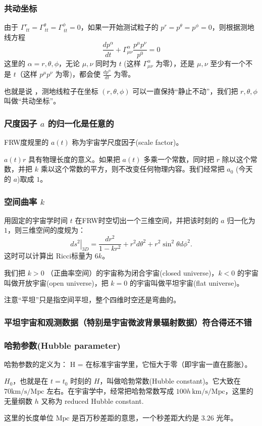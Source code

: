 \documentclass[CJK,13pt]{beamer}
\begin{document}
\begin{frame}
  \frametitle{共动坐标}
  由于 $\Gamma^r_{\ tt}=\Gamma^\theta_{\ tt} =\Gamma^{\phi}_{\ tt}=0$，如果一开始测试粒子的 $p^r=p^\theta=p^\phi = 0$，则根据测地线方程
  $$\frac{d p^\alpha}{dt} + \Gamma^{\alpha}_{\mu\nu}\frac{p^\mu p^\nu}{p^0} = 0$$
  这里的 $\alpha=r, \theta,\phi$，无论 $\mu,\nu$ 同时为 $t$ (这样 $\Gamma^{\alpha}_{\mu\nu}$ 为零），还是 $\mu,\nu$ 至少有一个不是 $t$（这样 $p^\mu p^\nu$ 为零)，都会使 $\frac{d p^\alpha}{dt}$ 为零。

      
  也就是说 ，测地线粒子在坐标 $(r,\theta,\phi)$ 可以一直保持“静止不动”，我们把 $r,\theta,\phi$ 叫做“共动坐标”。  
\end{frame}


\begin{frame}
  \frametitle{尺度因子 $a$ 的归一化是任意的} 
  FRW度规里的 $a(t)$ 称为{\blue 宇宙学尺度因子(scale factor)}。

  \skipline
  
  $a(t)r$ 具有物理长度的意义。如果把 $a(t)$ 多乘一个常数，同时把 $r$ 除以这个常数，并把 $k$ 乘以这个常数的平方，则不改变任何物理内容。我们经常把 $a_0$ (今天的 $a$)取成 $1$。
  
\end{frame}


\begin{frame}
  \frametitle{空间曲率 $k$}
  用固定的宇宙学时间 $t$ 在FRW时空切出一个三维空间，并把该时刻的 $a$ 归一化为 $1$，则三维空间的度规为：
  $$\left.ds^2\right\vert_{3D} = \frac{dr^2}{1-kr^2}+r^2d\theta^2+r^2\sin^2\theta d\phi^2.$$
  这时可以计算出 Ricci标量为 $6k$。

  \skiplines
  
  我们把 $k>0$ （正曲率空间）的宇宙称为闭合宇宙(closed universe)，$k<0$ 的宇宙叫做开放宇宙(open universe)，把 $k=0$ 的宇宙叫做平坦宇宙(flat universe)。

  {\scriptsize 注意“平坦”只是指空间平坦，整个四维时空还是弯曲的。}
  
\end{frame}

\begin{frame}
\frametitle{平坦宇宙和观测数据（特别是宇宙微波背景辐射数据）符合得还不错}
\end{frame}

\begin{frame}
  \frametitle{哈勃参数(Hubble parameter)}
  哈勃参数的定义为：
  \be
  H = 
  \ee
  在标准宇宙学里，它恒大于零（即宇宙一直在膨胀）。

  \skipline

  $H_0$，也就是在 $t=t_0$ 时刻的 $H$，叫做{\blue 哈勃常数(Hubble constant)}。它大致在 $70\mathrm{km/s/Mpc}$ 左右。在宇宙学中，经常把哈勃常数写成  $100h\, \mathrm{km/s/Mpc}$，这里的无量纲数 $h$ 又称为 reduced Hubble constant.

  \skipline

  {\scriptsize 这里的长度单位 $\mathrm{Mpc}$ 是百万秒差距的意思，一个秒差距大约是 $3.26$ 光年。}

\end{frame}
\end{document}
